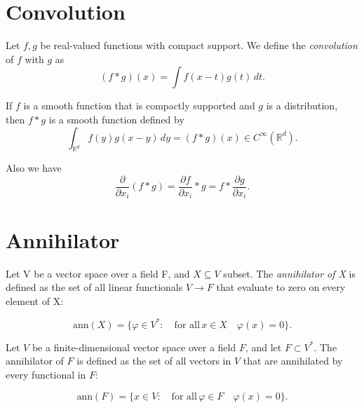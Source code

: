 \documentclass[../main.tex]{subfiles}
\begin{document}
\section{Convolution}
\begin{definition}
	Let $f,g$ be real-valued functions with compact support. We define the \emph{convolution} of $f$ with $g$ as $$(f\ast g)(x)=\int f(x-t)g(t) \, dt.$$
\end{definition}


\begin{propo} \cite{adams2003sobolev}
	If $f$ is a smooth function that is compactly supported and $g$ is a distribution, then $f\ast g$ is a smooth function defined by
	$${\displaystyle \int _{\mathbb {R} ^{d}}{f}(y)g(x-y)\,dy=(f*g)(x)\in C^{\infty }(\mathbb {R} ^{d}).} $$
	 \label{prop:29}
\end{propo}
\begin{propo} \label{prop:2} Also we have
	$${\frac {\partial }{\partial x_{i}}}(f*g)={\frac {\partial f}{\partial x_{i}}}*g=f*{\frac {\partial g}{\partial x_{i}}}.$$
\end{propo}
\newpage
\section{Annihilator}

\begin{definition}  Let V be a vector space over a field F, and $X\subseteq V$ subset. The \textit{annihilator of X} is defined as the set of all linear functionals $V \rightarrow F$ that evaluate to zero on every element of X:
	
	$$ \text{ann}(X) = \{ \varphi \in V^* : \quad \text{for all} \,  x \in X \quad \varphi (x) = 0 \}.$$
\end{definition}


\begin{definition}  Let $V$ be a finite-dimensional vector space over a field $F$, and let $F \subset V^*$. The annihilator of $F$ is defined as the set of all vectors in $V$ that are annihilated by every functional in $F$:
	
	\[
	\text{ann}(F) = \{x \in V :\quad \text{for all} \, \varphi \in F \quad\varphi(x) = 0\}.
	\]
	
\end{definition}
\end{document}
